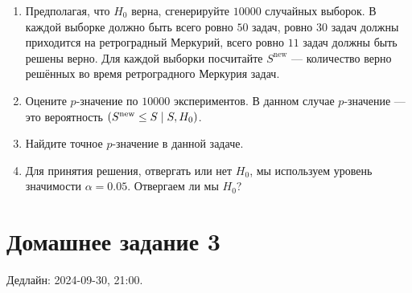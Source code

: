 \documentclass[12pt]{article}
\let\P\relax
\DeclareMathOperator{\P}{\mathbb{P}}
\begin{document}
\begin{enumerate}
\begin{enumerate}
    \item Предполагая, что $H_0$ верна, сгенерируйте $10000$ случайных выборок. 
    В каждой выборке должно быть всего ровно $50$ задач, ровно $30$ задач должны приходится на ретроградный Меркурий,
    всего ровно $11$ задач должны быть решены верно. 
    Для каждой выборки посчитайте $S^{\text{new}}$ — количество верно решённых во время ретроградного Меркурия задач.
    \item Оцените $p$-значение по $10000$ экспериментов. 
    В данном случае $p$-значение — это вероятность $\P(S^{\text{new}} \leq S \mid S, H_0)$.
    \item Найдите точное $p$-значение в данной задаче. 
    \item Для принятия решения, отвергать или нет $H_0$, мы используем уровень значимости $\alpha = 0.05$.
    Отвергаем ли мы $H_0$?
\end{enumerate}

\end{enumerate}


\section*{Домашнее задание 3}

Дедлайн: 2024-09-30, 21:00.
\end{document}
